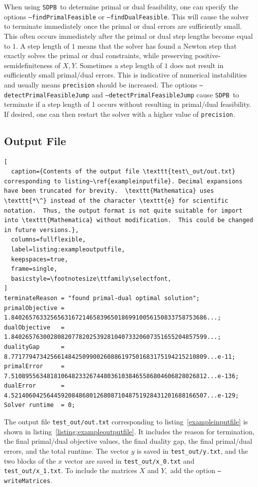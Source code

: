 \documentclass[12pt]{article}
\numberwithin{equation}{section}
\newcommand\SDPB{\texttt{SDPB}}
\begin{document}
When using \SDPB\ to determine primal or dual feasibility, one can specify the options \texttt{--findPrimalFeasible} or \texttt{--findDualFeasible}.  This will cause the solver to terminate immediately once the primal or dual errors are sufficiently small.  This often occurs immediately after the primal or dual step lengths become equal to $1$.  A step length of $1$ means that the solver has found a Newton step that exactly solves the primal or dual constraints, while preserving positive-semidefiniteness of $X,Y$.  Sometimes a step length of $1$ does not result in sufficiently small primal/dual errors.  This is indicative of numerical instabilities and usually means \texttt{precision} should be increased.  The options \texttt{--detectPrimalFeasibleJump} and \texttt{--detectPrimalFeasibleJump} cause \SDPB\ to terminate if a step length of 1 occurs without resulting in primal/dual feasibility.  If desired, one can then restart the solver with a higher value of \texttt{precision}.


\subsection{Output File}

\begin{lstlisting}[
  caption={Contents of the output file \texttt{test\_out/out.txt} corresponding to listing~\ref{exampleinputfile}. Decimal expansions have been truncated for brevity.  \texttt{Mathematica} uses \texttt{*\^} instead of the character \texttt{e} for scientific notation.  Thus, the output format is not quite suitable for import into \texttt{Mathematica} without modification.  This could be changed in future versions.},
  columns=fullflexible,
  label=listing:exampleoutputfile,
  keepspaces=true,
  frame=single,
  basicstyle=\footnotesize\ttfamily\selectfont,
]
terminateReason = "found primal-dual optimal solution";
primalObjective = 1.8402657633256563167214658396501869910056150833758753686...;
dualObjective   = 1.8402657630028082077820253928104073320607351655204857599...;
dualityGap      = 8.7717794734256614842509900260886197501683175194215210809...e-11;
primalError     = 7.5108955634818106482332674480361038465586804606828026812...e-136;
dualError       = 4.5214060425644592084868012680871048751928431201688166507...e-129;
Solver runtime  = 0;
\end{lstlisting}


The output file \texttt{test\_out/out.txt} corresponding to
listing~\ref{exampleinputfile} is shown in
listing~\ref{listing:exampleoutputfile}. It includes the reason for
termination, the final primal/dual objective values, the final duality
gap, the final primal/dual errors, and the total runtime. The vector
$y$ is saved in \texttt{test\_out/y.txt}, and the two blocks of the $x$ vector
are saved in \texttt{test\_out/x\_0.txt} and
\texttt{test\_out/x\_1.txt}.  To include the matrices $X$ and $Y,$ add the
option \texttt{--writeMatrices}.
\end{document}
